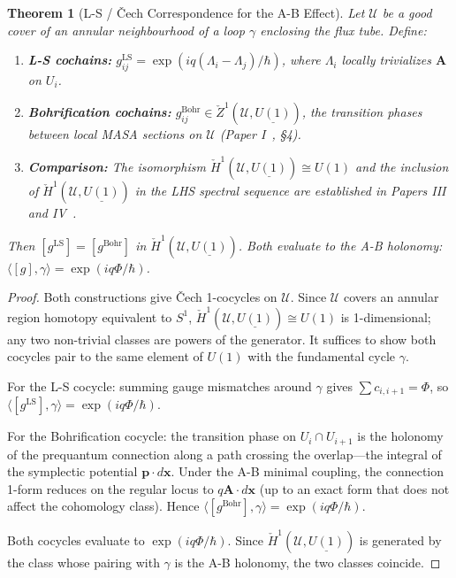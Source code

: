 \documentclass[11pt]{article}
\newtheorem{theorem}{Theorem}[section]
\begin{document}
\begin{theorem}[L-S / \v{C}ech Correspondence for the A-B Effect]
\label{thm:main}
Let $\mathcal{U}$ be a good cover of an annular neighbourhood of a loop $\gamma$
enclosing the flux tube. Define:
\begin{enumerate}
  \item \textbf{L-S cochains:}
    $g_{ij}^{\mathrm{LS}} = \exp(iq(\Lambda_i - \Lambda_j)/\hbar)$, where $\Lambda_i$
    locally trivializes $\mathbf{A}$ on $U_i$.
  \item \textbf{Bohrification cochains:}
    $g_{ij}^{\mathrm{Bohr}} \in \check{Z}^1(\mathcal{U}, \underline{U(1)})$,
    the transition phases between local MASA sections on $\mathcal{U}$
    (Paper I~\cite{PaperI}, \S4).
  \item \textbf{Comparison:}
    The isomorphism $\check{H}^1(\mathcal{U}, \underline{U(1)}) \cong U(1)$
    and the inclusion of $\check{H}^1(\mathcal{U}, \underline{U(1)})$
    in the LHS spectral sequence are established in
    Papers III~\cite{PaperIII} and IV~\cite{PaperIV}.
\end{enumerate}
Then $[g^{\mathrm{LS}}] = [g^{\mathrm{Bohr}}]$ in $\check{H}^1(\mathcal{U}, \underline{U(1)})$.
Both evaluate to the A-B holonomy: $\langle [g], \gamma \rangle = \exp(iq\Phi/\hbar)$.
\end{theorem}

\begin{proof}
Both constructions give \v{C}ech 1-cocycles on $\mathcal{U}$. Since
$\mathcal{U}$ covers an annular region homotopy equivalent to $S^1$,
$\check{H}^1(\mathcal{U}, \underline{U(1)}) \cong U(1)$ is 1-dimensional;
any two non-trivial classes are powers of the generator. It suffices to show
both cocycles pair to the same element of $U(1)$ with the fundamental cycle $\gamma$.

For the L-S cocycle: summing gauge mismatches around $\gamma$ gives
$\sum c_{i,i+1} = \Phi$, so $\langle [g^{\mathrm{LS}}], \gamma \rangle = \exp(iq\Phi/\hbar)$.

For the Bohrification cocycle: the transition phase on $U_i \cap U_{i+1}$ is the
holonomy of the prequantum connection along a path crossing the overlap---the
integral of the symplectic potential $\mathbf{p} \cdot d\mathbf{x}$. Under the
A-B minimal coupling, the connection 1-form reduces on the regular locus to
$q\mathbf{A} \cdot d\mathbf{x}$ (up to an exact form that does not affect the
cohomology class). Hence $\langle [g^{\mathrm{Bohr}}], \gamma \rangle = \exp(iq\Phi/\hbar)$.

Both cocycles evaluate to $\exp(iq\Phi/\hbar)$. Since $\check{H}^1(\mathcal{U}, \underline{U(1)})$
is generated by the class whose pairing with $\gamma$ is the A-B holonomy, the two
classes coincide.
\end{proof}
\end{document}
